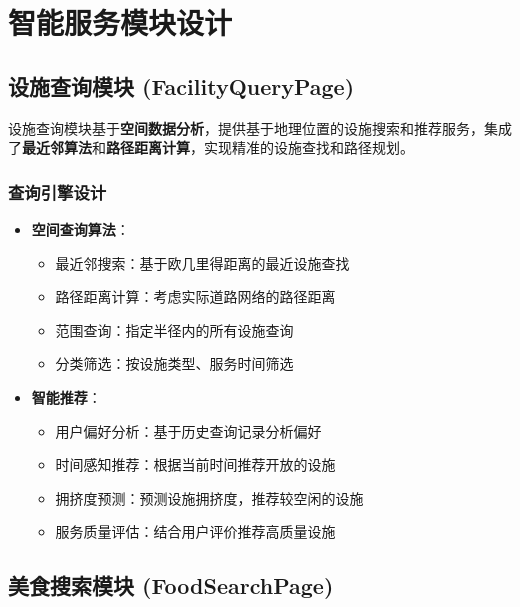 \documentclass[12pt,a4paper]{article}
\begin{document}
\section{智能服务模块设计}

\subsection{设施查询模块 (FacilityQueryPage)}

\begin{designbox}[title={智能查询设计}]
设施查询模块基于\textbf{空间数据分析}，提供基于地理位置的设施搜索和推荐服务，集成了\textbf{最近邻算法}和\textbf{路径距离计算}，实现精准的设施查找和路径规划。
\end{designbox}

\subsubsection{查询引擎设计}

\begin{itemize}
    \item \textbf{空间查询算法}：
    \begin{itemize}
        \item 最近邻搜索：基于欧几里得距离的最近设施查找
        \item 路径距离计算：考虑实际道路网络的路径距离
        \item 范围查询：指定半径内的所有设施查询
        \item 分类筛选：按设施类型、服务时间筛选
    \end{itemize}
    
    \item \textbf{智能推荐}：
    \begin{itemize}
        \item 用户偏好分析：基于历史查询记录分析偏好
        \item 时间感知推荐：根据当前时间推荐开放的设施
        \item 拥挤度预测：预测设施拥挤度，推荐较空闲的设施
        \item 服务质量评估：结合用户评价推荐高质量设施
    \end{itemize}
\end{itemize}

\subsection{美食搜索模块 (FoodSearchPage)}
\end{document}
